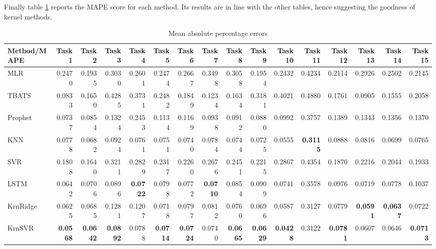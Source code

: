 Finally table \ref{tab:point_MAPE} reports the MAPE score for each method. Its results are in line with the other tables, hence suggesting the goodness of kernel methods.
\begin{table}[!ht]
    \caption{Mean absolute percentage errors}
    \label{tab:point_MAPE}
    \begin{adjustbox}{width=\textwidth}
        \begin{tabular}{lrrrrrrrrrrrrrrr}
            \toprule
             Method/MAPE & Task 1 & Task 2 & Task 3 & Task 4 & Task 5 & Task 6 & Task 7 & Task 8 & Task 9 & Task 10 & Task 11 & Task 12 & Task 13 & Task 14 & Task 15 \\
            \midrule
            MLR & 0.2470 & 0.1935 & 0.3030 & 0.2601 & 0.2474 & 0.2667 & 0.3498 & 0.3058 & 0.1954 & 0.2432 & 0.4234 & 0.2114 & 0.2926 & 0.2502 & 0.2145 \\
            TBATS & 0.0833 & 0.1650 & 0.4285 & 0.3731 & 0.2482 & 0.1849 & 0.1234 & 0.1634 & 0.3181 & 0.4021 & 0.4880 & 0.1761 & 0.0905 & 0.1555 & 0.2058 \\
            Prophet & 0.0737 & 0.0854 & 0.1324 & 0.2453 & 0.1134 & 0.1169 & 0.0938 & 0.0912 & 0.0880 & 0.0992 & 0.3757 & 0.1389 & 0.1343 & 0.1356 & 0.1370 \\
            KNN & 0.0778 & 0.0682 & 0.0924 & 0.0761 & 0.0751 & 0.0740 & 0.0784 & 0.0744 & 0.0725 & 0.0555 & \textbf{0.3115} & 0.0888 & 0.0816 & 0.0699 & 0.0765 \\
            SVR & 0.1808 & 0.1640 & 0.3211 & 0.2829 & 0.2317 & 0.2260 & 0.2676 & 0.2451 & 0.2215 & 0.2867 & 0.4354 & 0.1870 & 0.2216 & 0.2044 & 0.1933 \\
            LSTM & 0.0642 & 0.0706 & 0.0896 & \textbf{0.0722} & 0.0798 & 0.0772 & \textbf{0.0710} & 0.0854 & 0.0909 & 0.0741 & 0.3578 & 0.0976 & 0.0719 & 0.0778 & 0.1037 \\
            KrnRidge & 0.0625 & 0.0685 & 0.1281 & 0.1207 & 0.0718 & 0.0797 & 0.0812 & 0.0760 & 0.0696 & 0.0587 & 0.3127 & 0.0779 & \textbf{0.0591} & \textbf{0.0637} & 0.0722 \\
            KrnSVR & \textbf{0.0568} & \textbf{0.0642} & \textbf{0.0892} & 0.0788 & \textbf{0.0714} & \textbf{0.0724} & 0.0740 & \textbf{0.0665} & \textbf{0.0629} & \textbf{0.0428} & 0.3122 & \textbf{0.0781} & 0.0607 & 0.0646 & \textbf{0.0713} \\
            \bottomrule
            \end{tabular}            
    \end{adjustbox}
\end{table}


